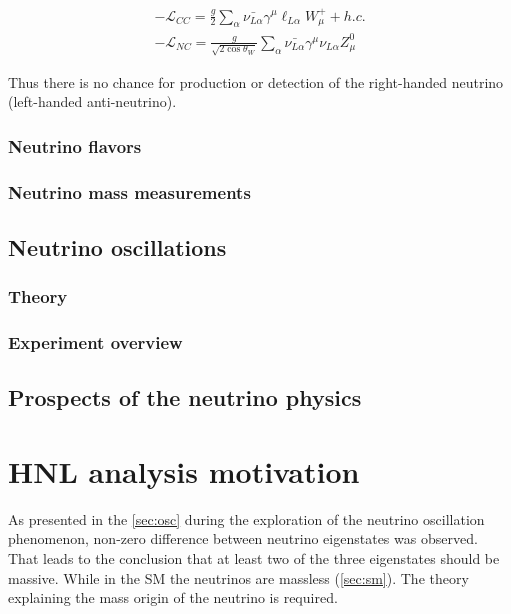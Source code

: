 \documentclass[../main.tex]{subfiles}
\begin{document}
\begin{eqnarray}
-\mathcal{L}_{CC}=\frac{g}{2}\sum_\alpha\bar{\nu_{L\alpha}}\gamma^\mu\ell_{L\alpha}W^+_\mu+h.c. \\ \nonumber
-\mathcal{L}_{NC}=\frac{g}{\sqrt{2\cos{\theta_W}}}\sum_\alpha\bar{\nu_{L\alpha}}\gamma^\mu\nu_{L\alpha}Z^0_\mu
\end{eqnarray}

Thus there is no chance for production or detection of the right-handed neutrino (left-handed anti-neutrino).

\subsection{Neutrino flavors}

\subsection{Neutrino mass measurements}


\section{Neutrino oscillations}
\label{sec:osc}

\subsection{Theory}

\subsection{Experiment overview}
\label{sec:exp}



\section{Prospects of the neutrino physics}





\chapter{HNL analysis motivation}
\label{ch:intro:HNL}

As presented in the \autoref{sec:osc} during the exploration of the neutrino oscillation phenomenon, non-zero difference between neutrino eigenstates was observed. That leads to the conclusion that at least two of the three eigenstates should be massive. While in the SM the neutrinos are massless (\autoref{sec:sm}). The theory explaining the mass origin of the neutrino is required.
\end{document}
